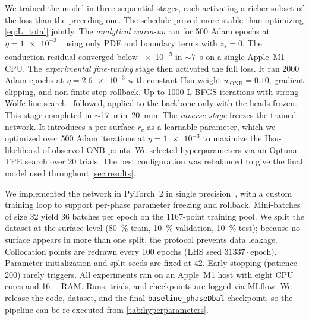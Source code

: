 We trained the model in three sequential stages, each activating a
richer subset of the loss than the preceding one. The schedule proved
more stable than optimizing \cref{eq:L_total} jointly. The \emph{analytical warm-up}
ran for \num{500} Adam epochs at $\eta=\num{1e-3}$~\citep{kingma2014adam}
using only PDE and boundary terms with $z_s=0$. The conduction
residual converged below \num{e-5} in $\sim$\SI{7}{\second} on a single
Apple~M1 CPU. The \emph{experimental fine-tuning} stage then activated
the full loss. It ran \num{2000} Adam epochs at $\eta=\num{2.6e-3}$
with constant Hsu weight $w_{\mathrm{ONB}}=\num{0.10}$, gradient
clipping, and non-finite-step rollback. Up to \num{1000} L-BFGS iterations with
strong Wolfe line search~\citep{liu1989lbfgs} followed, applied to the
backbone only with the heads frozen. This stage completed in
$\sim$\SIrange{17}{20}{\minute}. The \emph{inverse stage} freezes the
trained network. It introduces a per-surface $r_c$ as a learnable
parameter, which we optimized over \num{500} Adam iterations at
$\eta=\num{1e-3}$ to maximize the Hsu-likelihood of observed ONB
points. We selected hyperparameters via an Optuna TPE search over
\num{20} trials. The best configuration was rebalanced to give the
final model used throughout \cref{sec:results}.

We implemented the network in PyTorch~2 in single
precision~\citep{paszke2019pytorch}, with a custom training loop to
support per-phase parameter freezing and rollback. Mini-batches
of size \num{32} yield \num{36} batches per epoch on the
\num{1167}-point training pool. We split the dataset at the surface
level (\SI{80}{\percent} train, \SI{10}{\percent} validation,
\SI{10}{\percent} test); because no surface appears in more than one
split, the protocol prevents data leakage. Collocation points are redrawn every \num{100}
epochs (LHS seed $31337\cdot\text{epoch}$). Parameter initialization
and split seeds are fixed at \num{42}. Early stopping (patience
\num{200}) rarely triggers. All experiments ran on an Apple~M1 host
with eight CPU cores and \SI{16}{\giga\byte} RAM. Runs, trials, and
checkpoints are logged via MLflow. We release the code, dataset, and
the final \texttt{baseline\_phaseDbal} checkpoint, so the pipeline can
be re-executed from \cref{tab:hyperparameters}.

